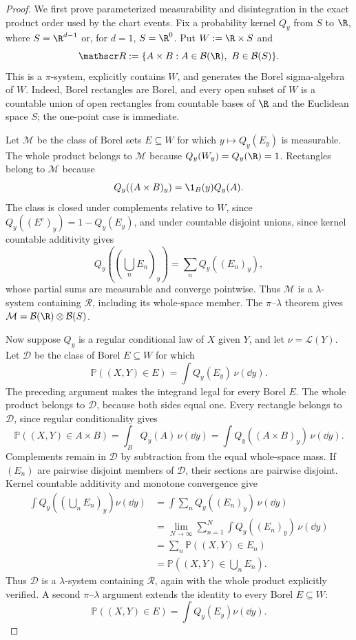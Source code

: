 \begin{proof}
We first prove parameterized measurability and disintegration in the exact
product order used by the chart events.  Fix a probability kernel $Q_y$ from
$S$ to $\R$, where $S=\R^{d-1}$ or, for $d=1$, $S=\R^0$.  Put
$W:=\R\times S$ and
\[
\mathscr R:=\{A\times B:A\in\mathcal B(\R),\ B\in\mathcal B(S)\}.
\]
This is a $\pi$-system, explicitly contains $W$, and generates the Borel
sigma-algebra of $W$.  Indeed, Borel rectangles are Borel, and every open
subset of $W$ is a countable union of open rectangles from countable bases
of $\R$ and the Euclidean space $S$; the one-point case is immediate.

Let $\mathcal M$ be the class of Borel sets $E\subseteq W$ for which
$y\mapsto Q_y(E_y)$ is measurable.  The whole product belongs to
$\mathcal M$ because $Q_y(W_y)=Q_y(\R)=1$.  Rectangles belong to
$\mathcal M$ because
\[
Q_y((A\times B)_y)=\1_B(y)Q_y(A).
\]
The class is closed under complements relative to $W$, since
$Q_y((E^c)_y)=1-Q_y(E_y)$, and under countable disjoint unions, since kernel
countable additivity gives
\[
Q_y\left(\left(\bigcup_nE_n\right)_y\right)
=\sum_nQ_y((E_n)_y),
\]
whose partial sums are measurable and converge pointwise.  Thus $\mathcal M$
is a $\lambda$-system containing $\mathscr R$, including its whole-space
member.  The $\pi$--$\lambda$ theorem \citep[Chapter~1]{Folland1999} gives
$\mathcal M=\mathcal B(\R)\otimes\mathcal B(S)$.

Now suppose $Q_y$ is a regular conditional law of $X$ given $Y$, and let
$\nu=\mathcal L(Y)$.  Let $\mathcal D$ be the class of Borel
$E\subseteq W$ for which
\[
\mathbb P((X,Y)\in E)=\int Q_y(E_y)\,\nu(\dd y).
\]
The preceding argument makes the integrand legal for every Borel $E$.  The
whole product belongs to $\mathcal D$, because both sides equal one.  Every
rectangle belongs to $\mathcal D$, since regular conditionality gives
\[
\mathbb P((X,Y)\in A\times B)
=\int_BQ_y(A)\,\nu(\dd y)
=\int Q_y((A\times B)_y)\,\nu(\dd y).
\]
Complements remain in $\mathcal D$ by subtraction from the equal
whole-space mass.  If $(E_n)$ are pairwise disjoint members of $\mathcal D$,
their sections are pairwise disjoint.  Kernel countable additivity and
monotone convergence \citep[Chapter~2]{Folland1999} give
\[
\begin{aligned}
\int Q_y\!\left(\left(\bigcup_nE_n\right)_y\right)\nu(\dd y)
&=\int\sum_nQ_y((E_n)_y)\,\nu(\dd y)\\
&=\lim_{N\to\infty}\sum_{n=1}^N
  \int Q_y((E_n)_y)\,\nu(\dd y)\\
&=\sum_n\mathbb P((X,Y)\in E_n)\\
&=\mathbb P\!\left((X,Y)\in\bigcup_nE_n\right).
\end{aligned}
\]
Thus $\mathcal D$ is a $\lambda$-system containing $\mathscr R$, again with
the whole product explicitly verified.  A second $\pi$--$\lambda$ argument
extends the identity to every Borel $E\subseteq W$:
\begin{equation}
\mathbb P((X,Y)\in E)=\int Q_y(E_y)\nu(\dd y).
\label{eq:general-disintegration}
\end{equation}


\end{proof}
